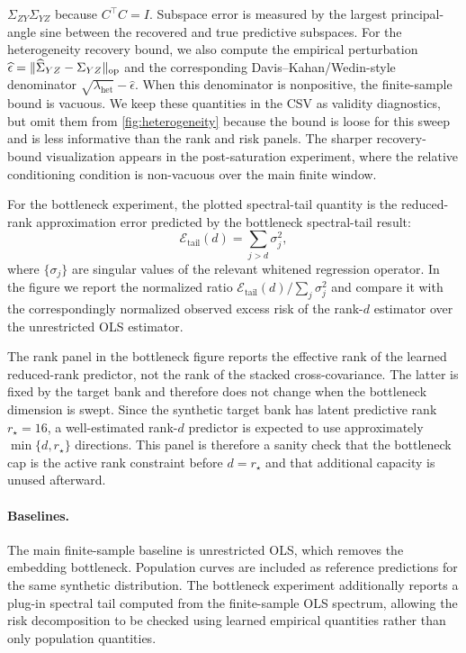 $\Sigma_{ZY}\Sigma_{YZ}$ because $C^\top C=I$. Subspace error is measured by
the largest principal-angle sine between the recovered and true predictive
subspaces.
For the heterogeneity recovery bound, we also compute the empirical
perturbation $\widehat{\epsilon}=\|\widehat{\Sigma}_{YZ}-\Sigma_{YZ}\|_{\rm op}$
and the corresponding Davis--Kahan/Wedin-style denominator
$\sqrt{\lambda_{\mathrm{het}}}-\widehat{\epsilon}$. When this denominator is
nonpositive, the finite-sample bound is vacuous. We keep these quantities in
the CSV as validity diagnostics, but omit them from
\cref{fig:heterogeneity} because the bound is loose for this sweep and is
less informative than the rank and risk panels. The sharper recovery-bound
visualization appears in the post-saturation experiment, where the relative
conditioning condition is non-vacuous over the main finite window.

For the bottleneck experiment, the plotted spectral-tail quantity is the
reduced-rank approximation error predicted by the bottleneck spectral-tail
result:
\[
    \mathcal{E}_{\mathrm{tail}}(d)
    =
    \sum_{j>d} \sigma_j^2,
\]
where $\{\sigma_j\}$ are singular values of the relevant whitened regression
operator. In the figure we report the normalized ratio
$\mathcal{E}_{\mathrm{tail}}(d)/\sum_j\sigma_j^2$ and compare it with the
correspondingly normalized observed excess risk of the rank-$d$ estimator over
the unrestricted OLS estimator.

The rank panel in the bottleneck figure reports the effective rank of the
learned reduced-rank predictor, not the rank of the stacked cross-covariance.
The latter is fixed by the target bank and therefore does not change when the
bottleneck dimension is swept. Since the synthetic target bank has latent
predictive rank $r_\star=16$, a well-estimated rank-$d$ predictor is expected to
use approximately $\min\{d,r_\star\}$ directions. This panel is therefore a
sanity check that the bottleneck cap is the active rank constraint before
$d=r_\star$ and that additional capacity is unused afterward.


\paragraph{Baselines.}
The main finite-sample baseline is unrestricted OLS, which removes the
embedding bottleneck. Population curves are included as reference predictions
for the same synthetic distribution. The bottleneck experiment additionally
reports a plug-in spectral tail computed from the finite-sample OLS spectrum,
allowing the risk decomposition to be checked using learned empirical
quantities rather than only population quantities.

